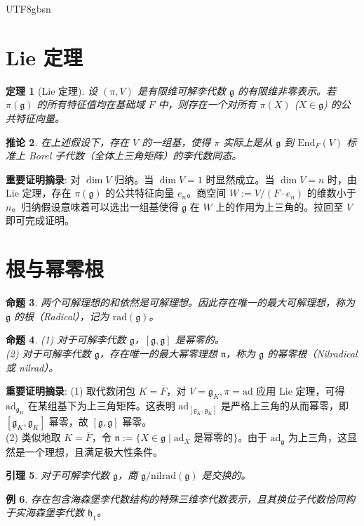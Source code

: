 \documentclass[11pt]{article}
\newtheorem{theorem}{定理}[section]
\newtheorem{lemma}[theorem]{引理}
\newtheorem{proposition}[theorem]{命题}
\newtheorem{corollary}[theorem]{推论}
\newtheorem{example}[theorem]{例}
\begin{document}
\begin{CJK*}{UTF8}{gbsn}
\section{Lie 定理}

\begin{theorem}[Lie 定理]
设 $(\pi, V)$ 是有限维可解李代数 $\mathfrak{g}$ 的有限维非零表示。若 $\pi(\mathfrak{g})$ 的所有特征值均在基础域 $F$ 中，则存在一个对所有 $\pi(X)$ ($X \in \mathfrak{g}$) 的公共特征向量。
\end{theorem}

\begin{corollary}
在上述假设下，存在 $V$ 的一组基，使得 $\pi$ 实际上是从 $\mathfrak{g}$ 到 $\mathrm{End}_F(V)$ 标准上 Borel 子代数（全体上三角矩阵）的李代数同态。
\end{corollary}
\textbf{重要证明摘录}:
对 $\dim V$ 归纳。当 $\dim V = 1$ 时显然成立。当 $\dim V = n$ 时，由 Lie 定理，存在 $\pi(\mathfrak{g})$ 的公共特征向量 $e_n$。商空间 $W := V/(F \cdot e_n)$ 的维数小于 $n$。归纳假设意味着可以选出一组基使得 $\mathfrak{g}$ 在 $W$ 上的作用为上三角的。拉回至 $V$ 即可完成证明。

\section{根与幂零根}

\begin{proposition}
两个可解理想的和依然是可解理想。因此存在唯一的最大可解理想，称为 $\mathfrak{g}$ 的根（Radical），记为 $\mathrm{rad}(\mathfrak{g})$。
\end{proposition}

\begin{proposition}
(1) 对于可解李代数 $\mathfrak{g}$，$[\mathfrak{g}, \mathfrak{g}]$ 是幂零的。\\
(2) 对于可解李代数 $\mathfrak{g}$，存在唯一的最大幂零理想 $\mathfrak{n}$，称为 $\mathfrak{g}$ 的幂零根（Nilradical 或 nilrad）。
\end{proposition}
\textbf{重要证明摘录}:
(1) 取代数闭包 $K = \overline{F}$，对 $V = \mathfrak{g}_K, \pi = \mathrm{ad}$ 应用 Lie 定理，可得 $\mathrm{ad}_{\mathfrak{g}_K}$ 在某组基下为上三角矩阵。这表明 $\mathrm{ad}_{[\mathfrak{g}_K, \mathfrak{g}_K]}$ 是严格上三角的从而幂零，即 $[\mathfrak{g}_K, \mathfrak{g}_K]$ 幂零，故 $[\mathfrak{g}, \mathfrak{g}]$ 幂零。\\
(2) 类似地取 $K = \overline{F}$，令 $\mathfrak{n} := \{X \in \mathfrak{g} \mid \mathrm{ad}_X \text{ 是幂零的}\}$。由于 $\mathrm{ad}_{\mathfrak{g}}$ 为上三角，这显然是一个理想，且满足极大性条件。

\begin{lemma}
对于可解李代数 $\mathfrak{g}$，商 $\mathfrak{g}/\mathrm{nilrad}(\mathfrak{g})$ 是交换的。
\end{lemma}

\begin{example}
存在包含海森堡李代数结构的特殊三维李代数表示，且其换位子代数恰同构于实海森堡李代数 $\mathfrak{h}_1$。
\end{example}

\end{CJK*}
\end{document}
